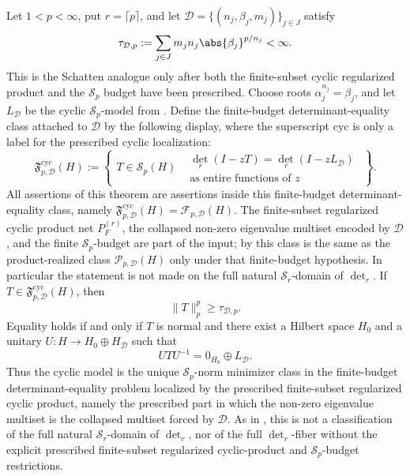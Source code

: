 \begin{theorem}
  \label{thm:schatten-determinant-fiber-minimality}
  Let \(1<p<\infty\), put \(r=\lceil p\rceil\), and let
  \(\mathcal D=\{(n_j,\beta_j,m_j)\}_{j\in J}\) satisfy
  \[
    \tau_{\mathcal D,p}
    :=\sum_{j\in J}m_jn_j\abs{\beta_j}^{p/n_j}<\infty .
  \]
  This is the Schatten analogue only after both the finite-subset cyclic
  regularized product and the \(\mathcal S_p\) budget have been prescribed.
  Choose roots \(\alpha_j^{n_j}=\beta_j\), and let \(L_{\mathcal D}\) be the
  cyclic \(\mathcal S_p\)-model from
  . Define the finite-budget
  determinant-equality class attached to \(\mathcal D\) by the following
  display, where the superscript \(\mathrm{cyc}\) is only a label for the
  prescribed cyclic localization:
  \[
    \mathfrak F_{p,\mathcal D}^{\mathrm{cyc}}(H)
    :=
    \left\{
      \begin{array}{l|l}
        T\in\mathcal S_p(H)&
        \begin{array}{l}
          \det_r(I-zT)=\det_r(I-zL_{\mathcal D})\\
          \text{as entire functions of }z
        \end{array}
      \end{array}
    \right\}.
  \]
  All assertions of this theorem are assertions inside this finite-budget
  determinant-equality class, namely
  \(\mathfrak F_{p,\mathcal D}^{\mathrm{cyc}}(H)
  =\mathcal F_{p,\mathcal D}(H)\).  The finite-subset regularized cyclic product
  net \(P_F^{(r)}\), the
  collapsed non-zero eigenvalue multiset encoded by \(\mathcal D\), and the
  finite \(\mathcal S_p\)-budget are part of the input; by
   this class is the same as the
  product-realized class \(\mathcal P_{p,\mathcal D}(H)\) only under that
  finite-budget hypothesis.  In particular the statement is not made on the full
  natural \(\mathcal S_r\)-domain of \(\det_r\). If
  \(T\in\mathfrak F_{p,\mathcal D}^{\mathrm{cyc}}(H)\), then
  \[
    \|T\|_p^p\ge \tau_{\mathcal D,p}.
  \]
  Equality holds if and only if \(T\) is normal and there exist a Hilbert
  space \(H_0\) and a unitary \(U:H\to H_0\oplus H_{\mathcal D}\) such
  that
  \[
    UTU^{-1}=0_{H_0}\oplus L_{\mathcal D}.
  \]
  Thus the cyclic model is the unique \(\mathcal S_p\)-norm minimizer class in
  the finite-budget determinant-equality problem localized by the prescribed
  finite-subset regularized cyclic product, namely the prescribed part in which the non-zero
  eigenvalue multiset is the collapsed multiset forced by \(\mathcal D\). As in
  , this is not a classification of the
  full natural \(\mathcal S_r\)-domain of \(\det_r\), nor of the full
  \(\det_r\)-fiber without the explicit prescribed finite-subset regularized cyclic-product
  and \(\mathcal S_p\)-budget restrictions.


\end{theorem}
